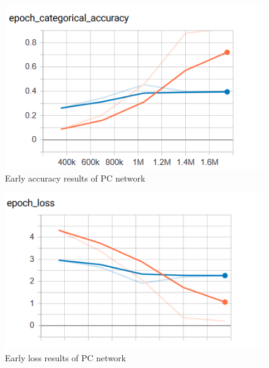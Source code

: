 \begin{figure}[!ht]
    \centering
    \includegraphics[scale=0.60]{images/PC_early_accuracy.png}
    \caption{Early accuracy results of PC network}
    \label{fig:early_PC_acc}
\end{figure}
\begin{figure}[!ht]
    \centering
    \includegraphics[scale=0.60]{images/PC_early_loss.png}
    \caption{Early loss results of PC network}
    \label{fig:early_PC_loss}
\end{figure}


